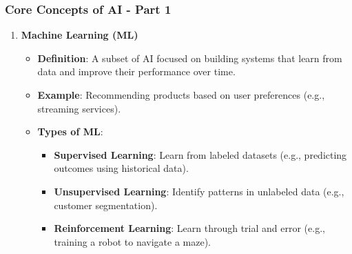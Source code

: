 \documentclass[aspectratio=169]{beamer}
\begin{document}
\begin{frame}[fragile]
    \frametitle{Core Concepts of AI - Part 1}

    \begin{enumerate}
        \item \textbf{Machine Learning (ML)}
        \begin{itemize}
            \item \textbf{Definition}: A subset of AI focused on building systems that learn from data and improve their performance over time.
            \item \textbf{Example}: Recommending products based on user preferences (e.g., streaming services).
            \item \textbf{Types of ML}:
            \begin{itemize}
                \item \textbf{Supervised Learning}: Learn from labeled datasets (e.g., predicting outcomes using historical data).
                \item \textbf{Unsupervised Learning}: Identify patterns in unlabeled data (e.g., customer segmentation).
                \item \textbf{Reinforcement Learning}: Learn through trial and error (e.g., training a robot to navigate a maze).
            \end{itemize}
        \end{itemize}
    \end{enumerate}
\end{frame}
\end{document}
